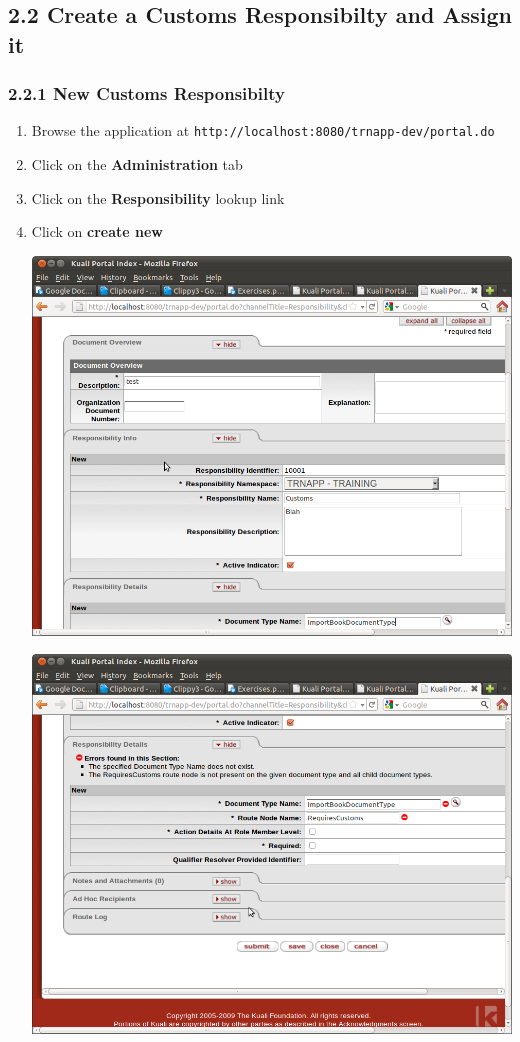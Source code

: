 \subsection*{2.2 Create a Customs Responsibilty and Assign it}
\subsubsection*{2.2.1 New Customs Responsibilty}
\begin{enumerate}
  \item Browse the application at
    \verb|http://localhost:8080/trnapp-dev/portal.do|
  \item Click on the \textbf{Administration} tab
  \item Click on the \textbf{Responsibility} lookup link
  \item Click on \textbf{create new}
    
    \includegraphics[width=\textwidth]{images/Screenshot21.png}

    \includegraphics[width=\textwidth]{images/Screenshot22.png}
\end{enumerate}


